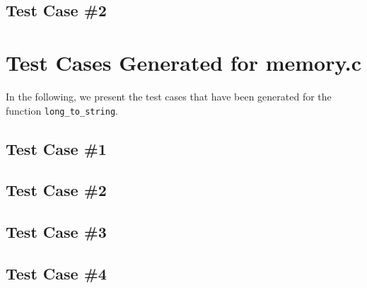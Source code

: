\subsection{Test Case \#2}



\newpage
\section{Test Cases Generated for memory.c}

In the following, we present the test cases that have been generated for the function \texttt{long\_to\_string}.

\subsection{Test Case \#1}


\subsection{Test Case \#2}


\subsection{Test Case \#3}


\subsection{Test Case \#4}


